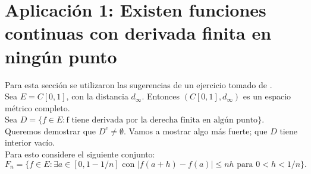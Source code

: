 \documentclass{article}
\theoremstyle{definition}
\begin{document}
\section{Aplicación 1: Existen funciones continuas con derivada finita en ningún punto}\label{ap1}

Para esta sección se utilizaron las sugerencias de un ejercicio tomado de \cite{cambronero505}.\\
Sea $E=C[0,1]$, con la distancia $d_\infty$. Entonces $(C[0,1],d_\infty)$ es un espacio métrico completo.\\
Sea $D=\{f\in E: \text{f tiene derivada por la derecha finita en algún punto}\}$.\\
Queremos demostrar que $D^c\neq \emptyset$. Vamos a mostrar algo más fuerte; que $D$ tiene interior vacío.\\
Para esto considere el siguiente conjunto:\\
$$
	F_n=\{f\in E: \exists a\in [0,1-1/n] \text{ con } |f(a+h)-f(a)|\leq nh \text{ para } 0<h<1/n\}.
$$
\end{document}
